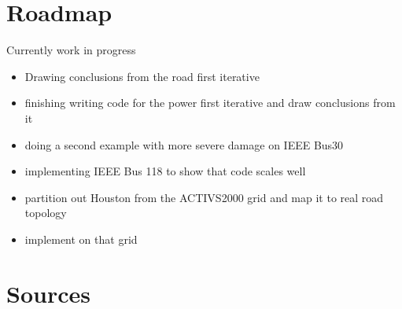 \documentclass{article}
\begin{document}
	\section{Roadmap}
Currently work in progress
\begin{itemize}
	\item Drawing conclusions from the road first iterative
	\item finishing writing code for the power first iterative and draw conclusions from it
	\item doing a second example with more severe damage on IEEE Bus30
	\item implementing IEEE Bus 118 to show that code scales well
	\item partition out Houston from the ACTIVS2000 grid and map it to real road topology
	\item implement on that grid
\end{itemize}

	\section{Sources}
	\printbibliography
\end{document}
